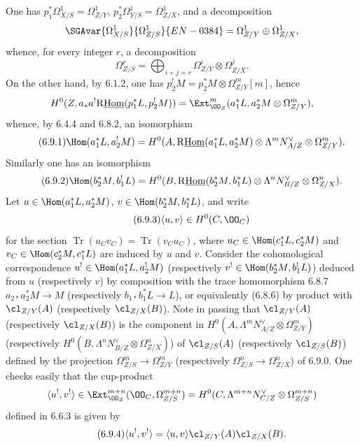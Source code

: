 One has $p_1^*\Omega^1_{X/S}=\Omega^1_{Z/Y}$, $p_2^*\Omega^1_{Y/S}=\Omega^1_{Z/X}$, and a decomposition
\[
\SGAvar{\Omega^1_{X/S}}{\Omega^1_{Z/S}}{EN-0384}=\Omega^1_{Z/Y}\oplus\Omega^1_{Z/X},
\]
whence, for every integer $r$, a decomposition
\begin{equation}
\tag{6.9.0}
\Omega^r_{Z/S}=\bigoplus_{i+j=r}\Omega^i_{Z/Y}\otimes\Omega^j_{Z/X}.
\end{equation}
On the other hand, by 6.1.2, one has $p_2^!M=p_2^*M\otimes\Omega^m_{Z/Y}[m]$, hence
\[
H^0(Z,a_*a^!\mathrm{R}\underline{\mathrm{Hom}}(p_1^*L,p_2^!M))=\Ext^m_{\OO_Z}(a_1^*L,a_2^*M\otimes\Omega^m_{Z/Y}),
\]
whence, by 6.4.4 and 6.8.2, an isomorphism
\begin{equation}
\tag{6.9.1}
\Hom(a_1^*L,a_2^!M)=H^0(A,\mathrm{R}\underline{\mathrm{Hom}}(a_1^*L,a_2^*M)\otimes\Lambda^m N_{A/Z}^{\vee}\otimes\Omega^m_{Z/Y}).
\end{equation}
Similarly one has an isomorphism
\begin{equation}
\tag{6.9.2}
\Hom(b_2^*M,b_1^!L)=H^0(B,\mathrm{R}\underline{\mathrm{Hom}}(b_2^*M,b_1^*L)\otimes\Lambda^n N_{B/Z}^{\vee}\otimes\Omega^n_{Z/X}).
\end{equation}
Let $u\in\Hom(a_1^*L,a_2^*M)$, $v\in\Hom(b_2^*M,b_1^*L)$, and write
\begin{equation}
\tag{6.9.3}
\langle u,v\rangle\in H^0(C,\OO_C)
\end{equation}
for the section $\operatorname{Tr}(u_Cv_C)=\operatorname{Tr}(v_Cu_C)$, where $u_C\in\Hom(c_1^*L,c_2^*M)$ and $v_C\in\Hom(c_2^*M,c_1^*L)$ are induced by $u$ and $v$. Consider the cohomological correspondence $u^!\in\Hom(a_1^*L,a_2^!M)$ (respectively $v^!\in\Hom(b_2^*M,b_1^!L)$) deduced from $u$ (respectively $v$) by composition with the trace homomorphism 6.8.7 $a_{2*}a_2^*M\to M$ (respectively $b_{1*}b_1^*L\to L$), or equivalently (6.8.6) by product with $\cl_{Z/Y}(A)$ (respectively $\cl_{Z/X}(B)$). Note in passing that $\cl_{Z/Y}(A)$ (respectively $\cl_{Z/X}(B)$) is the component in $H^0(A,\Lambda^mN_{A/Z}^{\vee}\otimes\Omega^m_{Z/Y})$ (respectively $H^0(B,\Lambda^nN_{B/Z}^{\vee}\otimes\Omega^n_{Z/X})$) of $\cl_{Z/S}(A)$ (respectively $\cl_{Z/S}(B)$) defined by the projection $\Omega^m_{Z/S}\to\Omega^m_{Z/Y}$ (respectively $\Omega^n_{Z/S}\to\Omega^n_{Z/X}$) of 6.9.0. One checks easily that the cup-product
\[
\langle u^!,v^!\rangle\in\Ext^{m+n}_{\OO_Z}(\OO_C,\Omega^{m+n}_{Z/S})=H^0(C,\Lambda^{m+n}N_{C/Z}^{\vee}\otimes\Omega^{m+n}_{Z/S})
\]
defined in 6.6.3 is given by
\begin{equation}
\tag{6.9.4}
\langle u^!,v^!\rangle=\langle u,v\rangle\cl_{Z/Y}(A)\cl_{Z/X}(B).
\end{equation}
